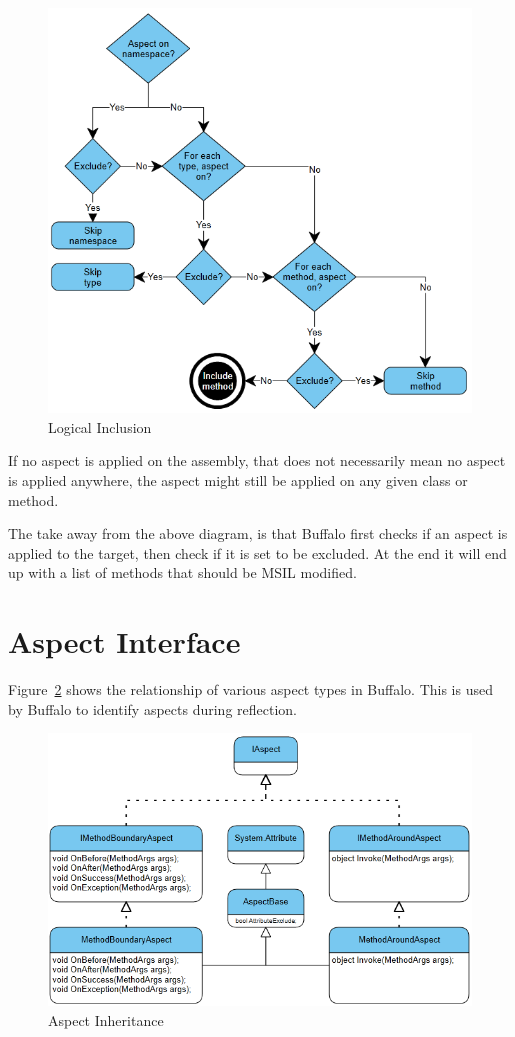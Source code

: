 \begin{figure}[H]
  \includegraphics[scale=1.0]{AspectLogicalInclusion.PNG}
  \centering
  \caption{Logical Inclusion\label{logical_inclusion}}
\end{figure}

If no aspect is applied on the assembly, that does not necessarily mean no aspect is applied anywhere, the aspect might still be applied on any given class or method.

The take away from the above diagram, is that Buffalo first checks if an aspect is applied to the target, then check if it is set to be excluded. At the end it will end up with a list of methods that should be MSIL modified.

\section{Aspect Interface}

Figure~\ref{uml01} shows the relationship of various aspect types in Buffalo. This is used by Buffalo to identify aspects during reflection.

\begin{figure}[H]
  \includegraphics[scale=1.0]{Uml01.PNG}
  \centering
  \caption{Aspect Inheritance\label{uml01}}
\end{figure}

